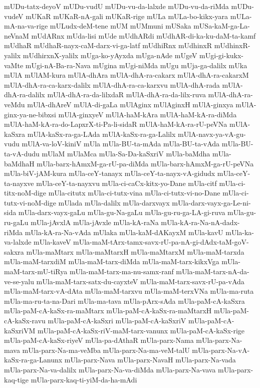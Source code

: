 {mUDu-tatx-deyoV
mUDu-vudU
mUDu-vu-da-lalxde
mUDu-vu-da-riMda
mUDu-vudeV
mUKaR
mUKaR-nA-gali
mUKaR-rige
mULa
mULa-bo-kikx-yara
mULa-mA-na-va-rige
mULudx-deM-tene
mUM
mUMmuni
mUSaka
mUSa-kaM-ga-La-neVnaM
mUdARnx
mUda-lisi
mUde
mUdhARdi
mUdhAR-di-ka-ku-daM-ta-kamf
mUdhaR
mUdhaR-nayx-caM-darx-vi-ga-latf
mUdhiRnx
mUdhinxR
mUdhinxR-yalilx
mUdhirxnX-yalilx
mUga-ko-yAyxda
mUga-nAde
mUgeV
mUgi-gi-kukx-vaMte
mUgi-nA-Ba-ra-Nava
mUgina
mUgi-niMda
mUgu
mUja-ga-dalilx
mUka
mUlA
mUlAM-kura
mUlA-dhAra
mUlA-dhA-ra-cakarx
mUlA-dhA-ra-cakarxM
mUlA-dhA-ra-ca-karx-dalilx
mUlA-dhA-ra-ca-karxvu
mUlA-dhA-rada
mUlA-dhA-ra-dalilx
mUlA-dhA-ra-da-lilxdaR
mUlA-dhA-ra-da-lilx-ruva
mUlA-dhA-ra-veMdu
mUlA-dhAreV
mUlA-di-gaLa
mUlAginx
mUlAginxH
mUlA-ginxya
mUlA-ginx-ya-ne-bibxsi
mUlA-ginxyeV
mUlA-haM-kAra
mUlA-haM-kA-ra-diMda
mUlA-haM-kA-ra-do-LapxrX-ti-Pa-li-sidaR
mUlA-haM-kA-ra-rU-peVNa
mUlA-kaSxra
mUlA-kaSx-ra-ga-LAda
mUlA-kaSx-ra-ga-Lalilx
mUlA-navx-ya-vA-gu-vudu
mUlA-va-loV-kiniV
mUla
mUla-BU-ta-mAda
mUla-BU-ta-vAda
mUla-BU-ta-vA-dudu
mUlaM
mUlaMca
mUla-Sa-Da-kaSxriV
mUla-baMdha
mUla-baMdhaH
mUla-barx-hAmxM-ga-rU-pa-diMda
mUla-barx-hAmxM-ga-rU-peVNa
mUla-biV-jAM-kura
mUla-ceY-tanayx
mUla-ceY-ta-nayx-vA-gidudx
mUla-ceY-ta-nayxve
mUla-ceY-ta-nayxvu
mUla-ci-caCx-kitx-yo-Dane
mUla-citf
mUla-ci-titx-noM-dige
mUla-citutx
mUla-ci-tutx-vina
mUla-ci-tutx-vi-no-Dane
mUla-ci-tutx-vi-noM-dige
mUlada
mUla-dalilx
mUla-darxvayx
mUla-darx-vayx-ga-Le-ni-sida
mUla-darx-vayx-gaLu
mUla-gu-Na-gaLu
mUla-gu-ru-ga-LA-gi-ruva
mUla-gu-ru-gaLu
mUla-jAvxlA
mUla-jAvxle
mUla-kA-raNa
mUla-kA-ra-Na-nA-dadx-riMda
mUla-kA-ra-Na-vAda
mUlaka
mUla-kaM-dAKayxM
mUla-kavU
mUla-ka-va-lalxde
mUla-kaveV
mUla-maM-tArx-tamx-savx-rU-pa-nA-gi-dAdx-taM-goV-sakxra
mUla-maMtarx
mUla-maMtarxH
mUla-maMtarxM
mUla-maM-tarxda
mUla-maM-tarxdiM
mUla-maM-tarx-diMda
mUla-maM-tarx-kikxVga
mUla-maM-tarx-mU-tiRya
mUla-maM-tarx-ma-nu-samx-ranf
mUla-maM-tarx-nA-da-ve-se-yalu
mUla-maM-tarx-satx-du-cayxteV
mUla-maM-tarx-savx-rU-pa-vAda
mUla-maM-tarx-vA-dAta
mUla-maM-tarxvu
mUla-maM-terxVNa
mUla-ma-ruta
mUla-ma-ru-ta-na-Dari
mUla-ma-tava
mUla-pArx-sAda
mUla-paM-cA-kaSxra
mUla-paM-cA-kaSx-ra-maMtarx
mUla-paM-cA-kaSx-ra-maMtarxH
mUla-paM-cA-kaSx-ravu
mUla-paM-cA-kaSxri
mUla-paM-cA-kaSxriV
mUla-paM-cA-kaSxriVM
mUla-paM-cA-kaSx-riV-maM-tarx-vanunx
mUla-paM-cA-kaSx-rige
mUla-paM-cA-kaSx-riyeV
mUla-pa-dAthaR
mUla-parx-Nama
mUla-parx-Na-mava
mUla-parx-Na-ma-veMba
mUla-parx-Na-ma-veM-talU
mUla-parx-Na-vA-kaSx-ra-ga-Lanunx
mUla-parx-Nava
mUla-parx-NavaH
mUla-parx-Na-vada
mUla-parx-Na-va-dalilx
mUla-parx-Na-va-diMda
mUla-parx-Na-vava
mUla-parx-kaq-tige
mUla-parx-kaq-ti-yiM-da-ha-mAdi
}
